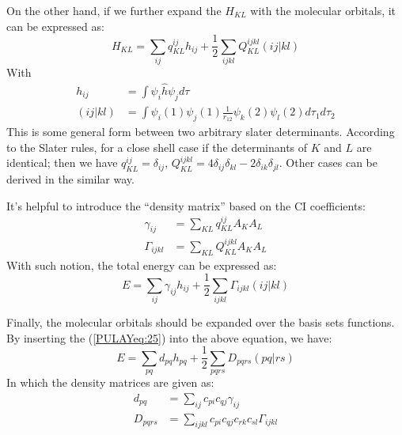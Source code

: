 On the other hand, if we further expand the $H_{KL}$ with the
molecular orbitals, it can be expressed as:
\begin{equation}\label{}
  H_{KL} = \sum_{ij}q^{ij}_{KL}h_{ij} +
  \frac{1}{2}\sum_{ijkl}Q^{ijkl}_{KL}(ij|kl)
\end{equation}
With
\begin{align}\label{}
  h_{ij} &= \int \psi_{i}\hat{h}\psi_{j}d\tau \nonumber \\
  (ij|kl) &=\int \psi_{i}(1)\psi_{j}(1)\frac{1}{r_{12}}
  \psi_{k}(2)\psi_{l}(2)d\tau_{1}d\tau_{2}
\end{align}
This is some general form between two arbitrary slater determinants.
According to the Slater rules, for a close shell case if the
determinants of $K$ and $L$ are identical; then we have $q^{ij}_{KL} =
\delta_{ij}$, $Q^{ijkl}_{KL} = 4\delta_{ij}\delta_{kl} -
2\delta_{ik}\delta_{jl}$. Other cases can be derived in the similar
way.

It's helpful to introduce the ``density matrix'' based on the CI
coefficients:
\begin{align}\label{}
  \gamma_{ij} &= \sum_{KL}q^{ij}_{KL}A_{K}A_{L} \nonumber \\
  \Gamma_{ijkl} &=\sum_{KL}Q^{ijkl}_{KL}A_{K}A_{L}
\end{align}
With such notion, the total energy can be expressed as:
\begin{equation}\label{}
  E = \sum_{ij}\gamma_{ij}h_{ij} +
  \frac{1}{2}\sum_{ijkl}\Gamma_{ijkl}(ij|kl)
\end{equation}

Finally, the molecular orbitals should be expanded over the basis sets
functions. By inserting the (\ref{PULAYeq:25}) into the above
equation, we have:
\begin{equation}\label{PULAYeq:27}
  E = \sum_{pq}d_{pq}h_{pq} + \frac{1}{2}\sum_{pqrs}D_{pqrs}(pq|rs)
\end{equation}
In which the density matrices are given as:
\begin{align}\label{}
  d_{pq} &=\sum_{ij}c_{pi}c_{qj}\gamma_{ij} \nonumber \\
  D_{pqrs} &=\sum_{ijkl}c_{pi}c_{qj}c_{rk}c_{sl}\Gamma_{ijkl}
\end{align}

